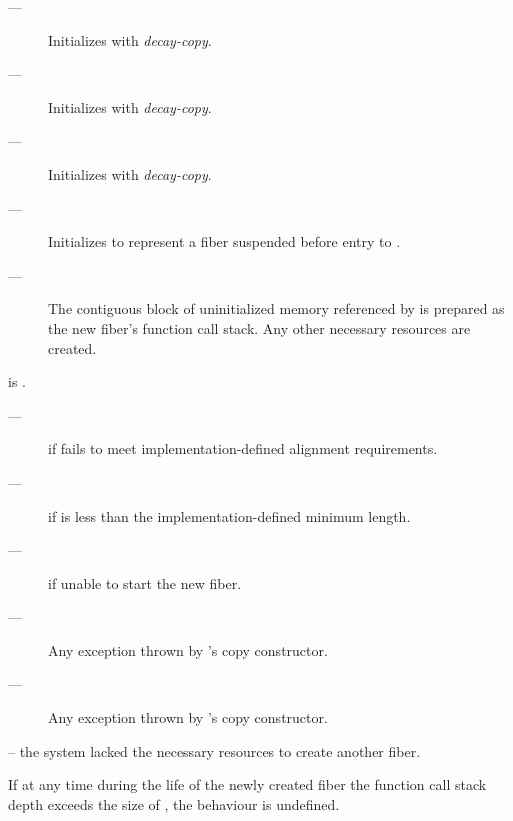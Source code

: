 \effects
\begin{description}
    \item[---] Initializes  with \emph{decay-copy}.
    \item[---] Initializes  with \emph{decay-copy}.
    \item[---] Initializes  with \emph{decay-copy}.
    \item[---] Initializes  to represent a fiber suspended before
              entry to .
    \item[---] The contiguous block of uninitialized memory referenced
              by  is prepared as the new fiber's function call stack.
              Any other necessary resources are created.
\end{description}

\postcond
\emptyfn is \false.

\except
\begin{description}
    \item[---]  if  fails to meet
               implementation-defined alignment requirements.
    \item[---]  if  is less than the
               implementation-defined minimum length.
    \item[---]  if unable to start the new fiber.
    \item[---] Any exception thrown by 's copy constructor.
    \item[---] Any exception thrown by 's copy constructor.
\end{description}

\errors
{} -- the system lacked the necessary resources to create another fiber.

\remarks
If at any time during the life of the newly created fiber the
function call stack depth exceeds the size of , the behaviour is
undefined.


